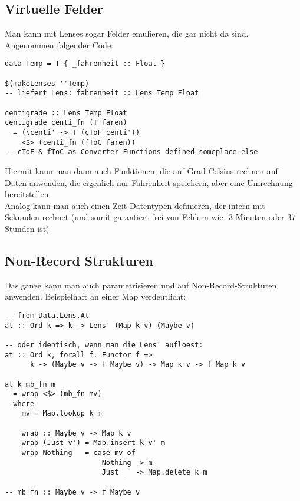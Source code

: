 \documentclass{beamer}
\begin{document}
\subsection{Virtuelle Felder}
\begin{frame}[fragile]
Man kann mit Lenses sogar Felder emulieren, die gar nicht da sind.\\
\pause
Angenommen folgender Code:

\begin{verbatim}
data Temp = T { _fahrenheit :: Float }

$(makeLenses ''Temp)
-- liefert Lens: fahrenheit :: Lens Temp Float

centigrade :: Lens Temp Float
centigrade centi_fn (T faren)
  = (\centi' -> T (cToF centi'))
    <$> (centi_fn (fToC faren))
-- cToF & fToC as Converter-Functions defined someplace else
\end{verbatim}
\pause
Hiermit kann man dann auch Funktionen, die auf Grad-Celsius rechnen auf
Daten anwenden, die eigenlich nur Fahrenheit speichern, aber eine
Umrechnung bereitstellen.\\Analog kann man auch einen Zeit-Datentypen
definieren, der intern mit Sekunden rechnet (und somit garantiert frei
von Fehlern wie -3 Minuten oder 37 Stunden ist)
\end{frame}

\subsection{Non-Record Strukturen}
\begin{frame}[fragile]
Das ganze kann man auch parametrisieren und auf Non-Record-Strukturen
anwenden. Beispielhaft an einer Map verdeutlicht:

\begin{verbatim}
-- from Data.Lens.At
at :: Ord k => k -> Lens' (Map k v) (Maybe v)

-- oder identisch, wenn man die Lens' aufloest:
at :: Ord k, forall f. Functor f => 
      k -> (Maybe v -> f Maybe v) -> Map k v -> f Map k v

at k mb_fn m
  = wrap <$> (mb_fn mv)
  where
    mv = Map.lookup k m
    
    wrap :: Maybe v -> Map k v
    wrap (Just v') = Map.insert k v' m
    wrap Nothing   = case mv of
                       Nothing -> m
                       Just _  -> Map.delete k m

-- mb_fn :: Maybe v -> f Maybe v
\end{verbatim}
\end{frame}
\end{document}
